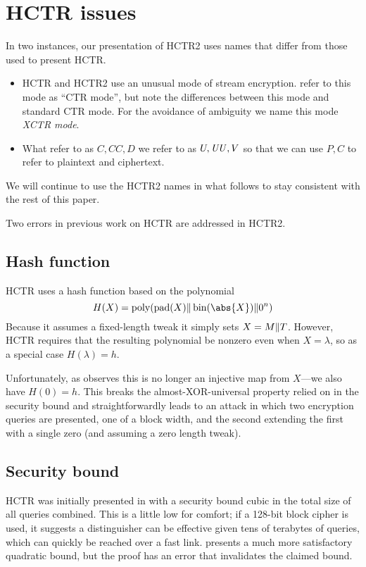 \documentclass[hctr.tex]{subfiles}
\begin{document}
\section{HCTR issues}
In two instances, our presentation of HCTR2 uses
names that differ from those used to present HCTR.

\begin{itemize}
    \item HCTR and HCTR2 use an unusual mode of stream encryption.
    \cite{hctr,hctrquad} refer to this mode as ``CTR mode'',
    but note the differences between this mode and 
    standard CTR mode\cite{ctr}.
    For the avoidance of ambiguity
    we name this mode \emph{XCTR mode}.
    \item What \cite{hctr,hctrquad} refer to as \(C, \mathit{CC}, D\)
    we refer to as \(U, \mathit{UU}, V\)
    so that we can use \(P, C\) to refer to plaintext and ciphertext.
\end{itemize}

We will continue to use the HCTR2 names in
what follows to stay consistent with the rest of this paper.

Two errors in previous work on HCTR are addressed in HCTR2.

\subsection{Hash function}\label{badhash}
HCTR uses a hash function based on the polynomial
\begin{displaymath}
    H(X) = \poly(\pad(X) \Concat \fromint(\abs{X}) \Concat 0^n)
\end{displaymath}
Because it assumes a fixed-length tweak it simply sets \(X = M \Vert T\).
However, HCTR requires that the resulting polynomial be nonzero
even when \(X = \lambda\),
so as a special case \(H(\lambda) = h\).

Unfortunately, as \cite{kumarhctr} observes this is no longer
an injective map from \(X\)---we also have \(H(0) = h\). This
breaks the almost-XOR-universal property relied on
in the security bound and
straightforwardly leads to an attack in which two encryption queries
are presented, one of a block width, and the second extending
the first with a single zero (and assuming a zero length tweak).

\subsection{Security bound}\label{badproof}
HCTR was initially presented in \cite{hctr} with a security bound cubic
in the total size of all queries combined.  This is a little low
for comfort; if a 128-bit block cipher is used, it suggests a
distinguisher can be effective given tens of terabytes of queries,
which can quickly be reached over a fast link. 
\cite{hctrquad} presents a much more satisfactory quadratic bound,
but the proof has an error that invalidates the claimed bound.
\end{document}
